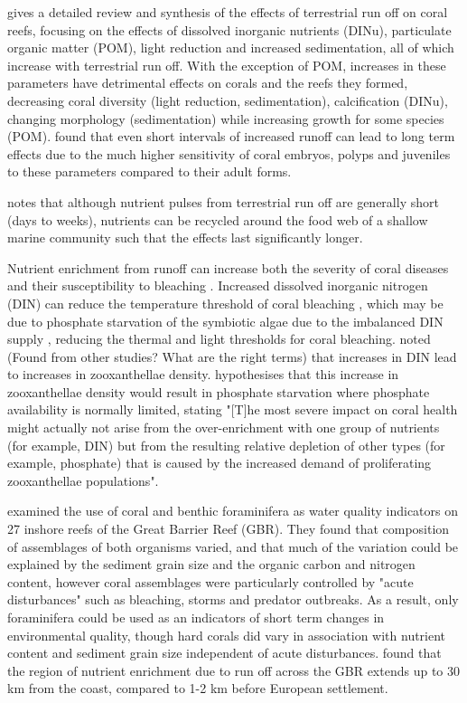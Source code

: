 \documentclass[11pt,a4paper]{article}
\begin{document}
\cite{Fabricius2005} gives a detailed review and synthesis of the effects of terrestrial run off on coral reefs, focusing on the effects of dissolved inorganic nutrients (DINu), particulate organic matter (POM), light reduction and increased sedimentation, all of which increase with terrestrial run off. With the exception of POM, increases in these parameters have detrimental effects on corals and the reefs they formed, decreasing coral diversity (light reduction, sedimentation), calcification (DINu), changing morphology (sedimentation) while increasing growth for some species (POM).
 \cite{Fabricius2005} found that even short intervals of increased runoff can lead to long term effects due to the much higher sensitivity of coral embryos, polyps and juveniles to these parameters compared to their adult forms. 

\cite{Wooldridge2009} notes that although nutrient pulses from terrestrial run off are generally short (days to weeks), nutrients can be recycled around the food web of a shallow marine community such that the effects last significantly longer.



Nutrient enrichment from runoff can increase both the severity of coral diseases \citep{Bruno2003} and their susceptibility to bleaching \citep{Wiedenmann2013}.
 Increased dissolved inorganic nitrogen (DIN) can reduce the temperature threshold of coral bleaching  \citep{Wooldridge2009}, which may be due to phosphate starvation of the symbiotic algae due to the imbalanced DIN supply \citep{Wiedenmann2013}, reducing the thermal and light thresholds for coral bleaching.
 \cite{Fabricius2005} noted (Found from other studies? What are the right terms) that increases in DIN lead to increases in zooxanthellae density.
 \cite{Wiedemann2013} hypothesises that this increase in zooxanthellae density would result in phosphate starvation where phosphate availability is normally limited, stating "[T]he most severe impact on coral health might actually not arise from the over-enrichment with one group of nutrients (for example, DIN) but from the resulting relative depletion of other types (for example, phosphate) that is caused by the increased demand of proliferating zooxanthellae populations".

\cite{Uthicke2010} examined the use of coral and benthic foraminifera as water quality indicators on 27 inshore reefs of the Great Barrier Reef (GBR).
 They found that composition of assemblages of both organisms varied, and that much of the variation could be explained by the sediment grain size and the organic carbon and nitrogen content, however coral assemblages were particularly controlled by "acute disturbances" such as bleaching, storms and predator outbreaks.
  As a result, only foraminifera could be used as an indicators of short term changes in environmental quality, though hard corals did vary in association with nutrient content and sediment grain size independent of acute disturbances.
 \cite{Wooldridge2006} found that the region of nutrient enrichment due to run off across the GBR extends up to 30 km from the coast, compared to 1-2 km before European settlement.
\end{document}
